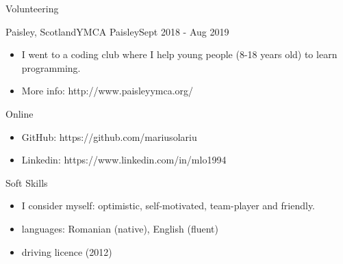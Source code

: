 \documentclass[]{mcdowellcv}
\begin{document}
	\begin{cvsection}{Volunteering}
		\begin{cvsubsection}{Paisley, Scotland}{YMCA Paisley}{Sept 2018 - Aug 2019}
			\begin{itemize}
				\item I went to a coding club where I help young people (8-18 years old) to learn programming. 
				\item More info: http://www.paisleyymca.org/
			\end{itemize}
		\end{cvsubsection}
	\end{cvsection}

	\begin{cvsection}{Online}
		\begin{cvsubsection}{}{}{}
			\begin{itemize}
				\item GitHub: https://github.com/mariusolariu
				\item Linkedin: https://www.linkedin.com/in/mlo1994
			\end{itemize}
		\end{cvsubsection}
	\end{cvsection}

	\begin{cvsection}{Soft Skills}
		\begin{cvsubsection}{}{}{}
			\begin{itemize}
				\item I consider myself: optimistic, self-motivated, team-player and friendly.
				\item languages: Romanian (native), English (fluent)
				\item driving licence (2012)
			\end{itemize}
		\end{cvsubsection}
	\end{cvsection}
	
\end{document}
